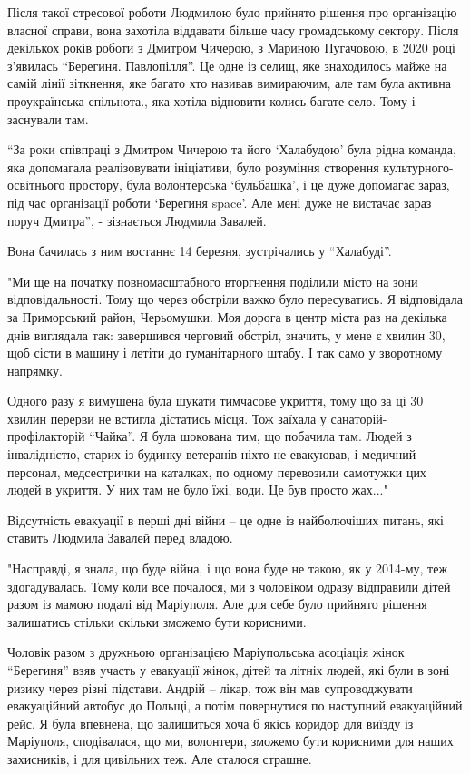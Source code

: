 Після такої стресової роботи Людмилою було прийнято рішення про організацію
власної справи, вона захотіла віддавати більше часу громадському сектору. Після
декількох років роботи з Дмитром Чичерою, з Мариною Пугачовою, в 2020 році
з’явилась \enquote{Берегиня. Павлопілля}. Це одне із селищ, яке знаходилось майже на
самій лінії зіткнення, яке багато хто називав вимираючим, але там була активна
проукраїнська спільнота., яка хотіла відновити колись багате село. Тому і
заснували там.

\enquote{За роки співпраці з Дмитром Чичерою та його \enquote{Халабудою} була рідна команда,
яка допомагала реалізовувати ініціативи, було розуміння створення
культурного-освітнього простору, була волонтерська \enquote{бульбашка}, і це дуже
допомагає зараз, під час організації роботи \enquote{Берегиня space}. Але  мені дуже не
вистачає зараз поруч Дмитра}, - зізнається Людмила Завалей.

Вона бачилась з ним востаннє 14 березня, зустрічались у \enquote{Халабуді}.

"Ми ще на початку повномасштабного вторгнення поділили місто на зони
відповідальності. Тому що через обстріли важко було пересуватись. Я відповідала
за Приморський район, Черьомушки. Моя дорога в центр міста раз на декілька днів
виглядала так: завершився черговий обстріл, значить, у мене є хвилин 30, щоб
сісти в машину і летіти до гуманітарного штабу. І так само у зворотному
напрямку.

Одного разу я вимушена була шукати тимчасове укриття, тому що за ці 30 хвилин
перерви не встигла дістатись місця. Тож заїхала у санаторій-профілакторій
\enquote{Чайка}. Я була шокована тим, що побачила там. Людей з інвалідністю, старих із
будинку ветеранів ніхто не евакуював, і медичний персонал, медсестрички на
каталках, по одному перевозили самотужки цих людей в укриття. У них там не було
їжі, води. Це був просто жах..."

Відсутність евакуації в перші дні війни – це одне із найболючіших питань, які
ставить Людмила Завалей перед владою.

"Насправді, я знала, що буде війна, і що вона буде не такою, як у 2014-му, теж
здогадувалась. Тому коли все почалося, ми з чоловіком одразу відправили дітей
разом із мамою подалі від Маріуполя. Але для себе було прийнято рішення
залишатись стільки скільки зможемо бути корисними.

Чоловік разом з дружньою організацією Маріупольська асоціація жінок \enquote{Берегиня}
взяв участь у евакуації  жінок, дітей та літніх людей, які були в зоні ризику
через різні підстави. Андрій – лікар, тож він мав супроводжувати евакуаційний
автобус до Польщі, а потім повернутися по наступний евакуаційний рейс. Я була
впевнена, що залишиться хоча б якісь коридор для виїзду із Маріуполя,
сподівалася, що ми, волонтери, зможемо бути корисними для наших захисників, і
для цивільних теж. Але сталося страшне.

